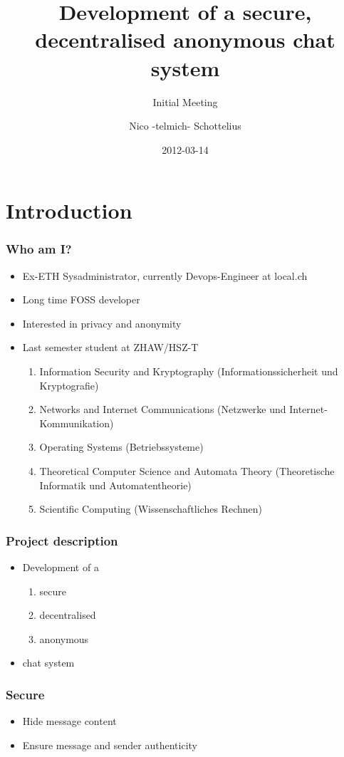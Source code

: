 \documentclass{beamer}
\title{Development of a secure, decentralised anonymous chat system}
\subtitle{Initial Meeting}
\author{Nico -telmich- Schottelius}
\date{2012-03-14}
\begin{document}
\frame{\titlepage}

\frame{\tableofcontents}

\section{Introduction}
\frame
{
  \frametitle{Who am I?}
  \begin{itemize}
  \item Ex-ETH Sysadministrator, currently Devops-Engineer at local.ch
  \item Long time FOSS developer 
  \item Interested in privacy and anonymity
  \item Last semester student at ZHAW/HSZ-T
  \begin{enumerate}
      \item  Information Security and Kryptography (Informationssicherheit und Kryptografie)
      \item  Networks and Internet Communications (Netzwerke und Internet-Kommunikation)
      \item  Operating Systems (Betriebssysteme)
      \item  Theoretical Computer Science and Automata Theory (Theoretische Informatik und Automatentheorie)
      \item  Scientific Computing (Wissenschaftliches Rechnen)
  \end{enumerate}
  \end{itemize}
}

\frame
{
  \frametitle{Project description}
  \begin{itemize}
  \item Development of a
  \begin{enumerate}
      \item  secure
      \item  decentralised
      \item  anonymous
  \end{enumerate}
  \item chat system
  \end{itemize}
}

\frame
{
  \frametitle{Secure}
  \begin{itemize}
  \item Hide message content
  \item Ensure message and sender authenticity
  \end{itemize}
}
\end{document}
